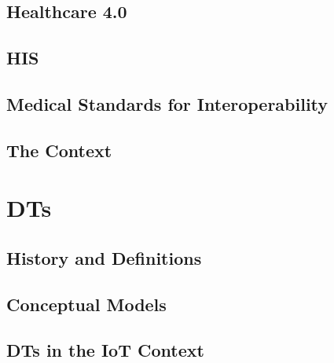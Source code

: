 \documentclass[12pt,a4paper,openright,twoside]{book}
\begin{document}
\section{Healthcare 4.0}

\section{\acl{HIS}}

\section{Medical Standards for Interoperability}

\section{The \ausl{} Context}

\chapter{\aclp{DT}}
\label{chap:back:DT}

\section{History and Definitions}

\section{Conceptual Models}

\section{\aclp{DT} in the \acs{IoT} Context}
\end{document}
